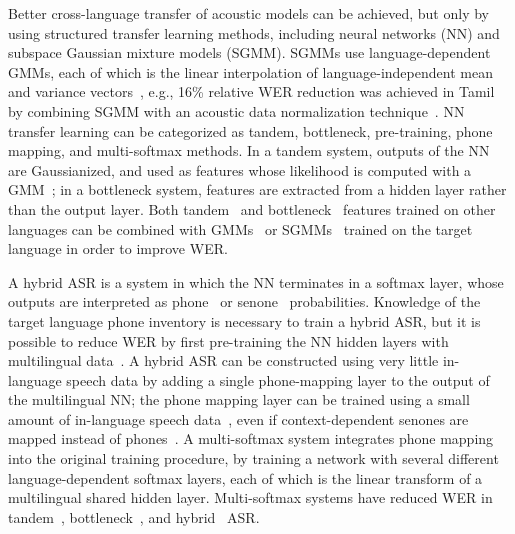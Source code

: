 Better cross-language transfer of acoustic models can be achieved, but
only by using structured transfer learning methods, including neural
networks (NN) and subspace Gaussian mixture models (SGMM).  SGMMs use
language-dependent GMMs, each of which is the linear interpolation of
language-independent mean and variance vectors~\cite{Povey2011}, e.g.,
16\% relative WER reduction was achieved in Tamil by combining SGMM
with an acoustic data normalization technique~\cite{Mohan2014}.  NN
transfer learning can be categorized as tandem, bottleneck,
pre-training, phone mapping, and multi-softmax methods.  In a tandem
system, outputs of the NN are Gaussianized, and used as features whose
likelihood is computed with a GMM~\cite{Hermansky2000}; in a
bottleneck system, features are extracted from a hidden layer rather
than the output layer. Both tandem~\cite{Stolcke2006} and
bottleneck~\cite{Vesely2012} features trained on other languages can
be combined with GMMs~\cite{Vesely2012} or SGMMs~\cite{Imseng2014}
trained on the target language in order to improve WER.

A hybrid ASR is a system in which the NN terminates in a softmax
layer, whose outputs are interpreted as phone~\cite{Morgan95} or
senone~\cite{Dahl2012} probabilities.  Knowledge of the target
language phone inventory is necessary to train a hybrid ASR, but it is
possible to reduce WER by first pre-training the NN hidden layers with
multilingual data~\cite{Huang2013,Swietojanski2012}.  A hybrid ASR can be
constructed using very little in-language speech data by adding a
single phone-mapping layer to the output of the multilingual NN; the
phone mapping layer can be trained using a small amount of in-language
speech data~\cite{Sim2008}, even if context-dependent senones are
mapped instead of phones~\cite{Do2012}.  A multi-softmax system
integrates phone mapping into the original training procedure, by
training a network with several different language-dependent softmax
layers, each of which is the linear transform of a multilingual shared
hidden layer.  Multi-softmax systems have reduced WER in
tandem~\cite{Scanzio2008}, bottleneck~\cite{Vesely2012}, and
hybrid~\cite{Huang2013} ASR.

